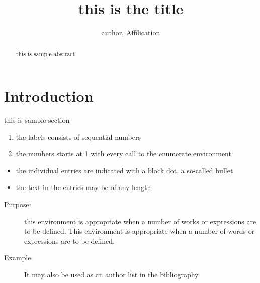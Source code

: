 \documentclass{article}
\begin{document}
\title{this is the title}
\author{author, Affilication}
\date{}

\maketitle

\begin{abstract}
this is sample abstract
\end{abstract}

\section{Introduction}
this is sample section

\begin{enumerate}
    \item the labels consists of sequential numbers
    \item the numbers starts at 1 with every call to the enumerate environment
\end{enumerate}

\begin{itemize}
    \item the individual entries are indicated with a block dot, a so-called bullet
    \item the text in the entries may be of any length
\end{itemize}

\begin{description}
    \item[Purpose:] this environment is appropriate when a number of works or
                    expressions are to be defined. This environment is appropriate when a number of words or expressions are to be defined.
    \item[Example:] It may also be used as an author list in the bibliography
\end{description}
\end{document}
